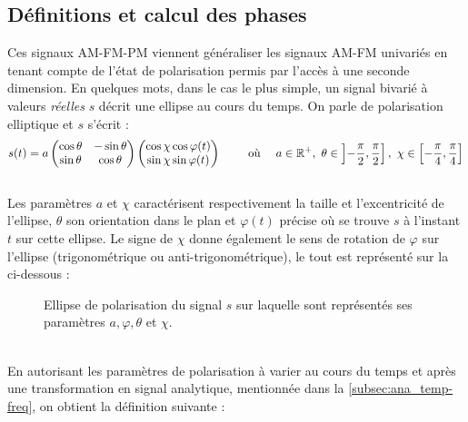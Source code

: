 \subsection{Définitions et calcul des phases} \label{subsec:AM-FM-PM}

Ces signaux AM-FM-PM viennent généraliser les signaux AM-FM univariés en tenant compte de l'état de polarisation permis par l'accès à une seconde dimension. 
En quelques mots, dans le cas le plus simple, un signal bivarié à valeurs \emph{réelles} $s$ décrit une ellipse au cours du temps. 
On parle de polarisation elliptique et $s$ s'écrit :
\[s(t) = a \begin{pmatrix} \cos\theta & -\sin\theta \\ \sin\theta  &  \cos\theta \end{pmatrix} \begin{pmatrix} \cos\chi \cos\varphi(t) \\ \sin\chi \sin\varphi(t) \end{pmatrix}  \qquad \text{ où }\quad  a\in\mathbb{R}^+,\ \theta \in \left]-\frac{\pi}{2}, \frac{\pi}{2}\right],\ \chi \in \left[-\frac{\pi}{4}, \frac{\pi}{4}\right] \]
\\
Les paramètres $a$ et $\chi$ caractérisent respectivement la taille et l'excentricité de l'ellipse, $\theta$ son orientation dans le plan et $\varphi(t)$ précise où se trouve $s$ à l'instant $t$ sur cette ellipse. Le signe de $\chi$ donne également le sens de rotation de $\varphi$ sur l'ellipse (trigonométrique ou anti-trigonométrique), le tout est représenté sur la  ci-dessous :
\begin{figure}[H]
	
	\caption[ Ellipse de polarisation d'un signal bivarié réel]{Ellipse de polarisation du signal $s$ sur laquelle sont représentés ses paramètres $a,\varphi,\theta$ et $\chi$.}
	\label{fig:ellipse2polar}
\end{figure}
\skipl \\
En autorisant les paramètres de polarisation à varier au cours du temps et après une transformation en signal analytique, mentionnée dans la \cref{subsec:ana_temp-freq}, on obtient la définition suivante :
\\
